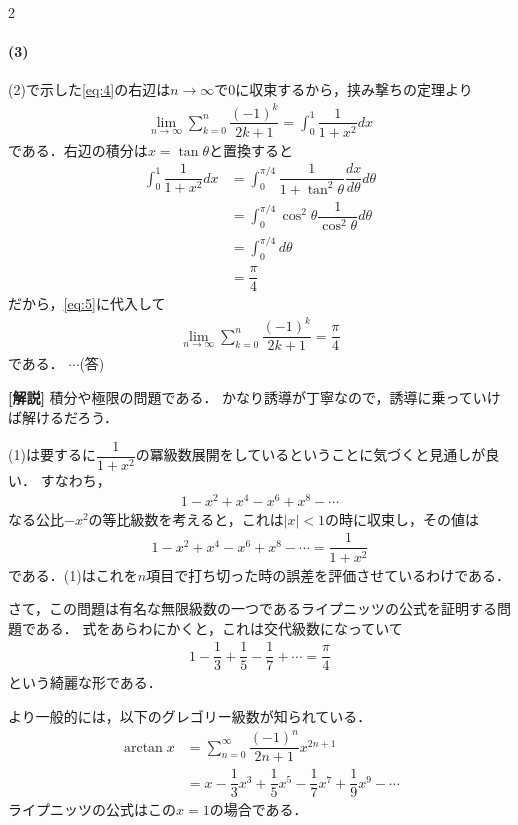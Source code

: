 \documentclass[../../main.tex]{subfiles}
\begin{document}
\begin{multicols}{2}
  \paragraph{(3)}
  (2)で示した\cref{eq:4}の右辺は$n\to\infty$で$0$に収束するから，挟み撃ちの定理より
  \begin{align}
    \lim_{n\to\infty} \sum_{k=0}^n \dfrac{(-1)^k}{2k+1} = \int_0^1 \dfrac{1}{1+x^2} dx \label{eq:5}
  \end{align}
  である．右辺の積分は$x=\tan\theta$と置換すると
  \begin{align}
    \int_0^1 \dfrac{1}{1+x^2} dx
    & = \int_0^{\pi/4} \dfrac{1}{1+\tan^2\theta} \dfrac{dx}{d\theta} d\theta \\
    & = \int_0^{\pi/4} \cos^2\theta \dfrac{1}{\cos^2\theta} d\theta         \\
    & = \int_0^{\pi/4} d\theta                                             \\
    & = \dfrac{\pi}{4}
  \end{align}
  だから，\cref{eq:5}に代入して
  \begin{align}
    \lim_{n\to\infty} \sum_{k=0}^n \dfrac{(-1)^k}{2k+1} = \dfrac{\pi}{4}
  \end{align}
  である．  $\cdots$(答)

  {\bf [解説]}
  積分や極限の問題である．
  かなり誘導が丁寧なので，誘導に乗っていけば解けるだろう．

  (1)は要するに$\dfrac{1}{1+x^2}$の冪級数展開をしているということに気づくと見通しが良い．
  すなわち，
  \begin{align}
    1-x^2+x^4-x^6+x^8-\cdots
  \end{align}
  なる公比$-x^2$の等比級数を考えると，これは$|x|<1$の時に収束し，その値は
  \begin{align}
    1-x^2+x^4-x^6+x^8-\cdots = \dfrac{1}{1+x^2}
  \end{align}
  である．(1)はこれを$n$項目で打ち切った時の誤差を評価させているわけである．

  さて，この問題は有名な無限級数の一つであるライプニッツの公式を証明する問題である．
  式をあらわにかくと，これは交代級数になっていて
  \begin{align}
    1-\dfrac{1}{3}+\dfrac{1}{5}-\dfrac{1}{7}+\cdots = \dfrac{\pi}{4}
  \end{align}
  という綺麗な形である．

  より一般的には，以下のグレゴリー級数が知られている．
  \begin{align}
    \arctan x
    & = \sum_{n=0}^{\infty}\dfrac{(-1)^n}{2n+1}x^{2n+1}                       \\
    & = x-\dfrac{1}{3}x^3+\dfrac{1}{5}x^5-\dfrac{1}{7}x^7+\dfrac{1}{9}x^9-\cdots
  \end{align}
  ライプニッツの公式はこの$x=1$の場合である．


\end{multicols}
\end{document}
